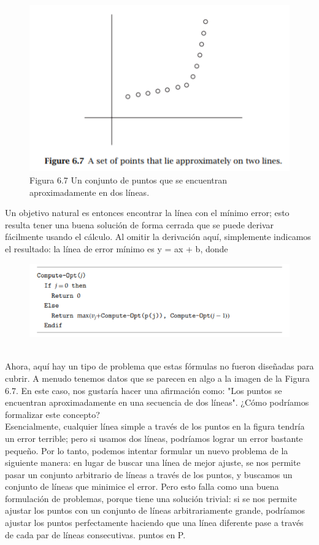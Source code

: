 \documentclass[a4paper]{article}
\begin{document}
\begin{figure}[h]
\centering
\includegraphics[scale=1]{Imagenes-Seccion6/fig6_7.PNG}
\caption{Figura 6.7 Un conjunto de puntos que se encuentran aproximadamente en dos líneas.}
\end{figure}

Un objetivo natural es entonces encontrar la línea con el mínimo error; esto resulta tener una buena solución de forma cerrada que se puede derivar fácilmente usando el cálculo. Al omitir la derivación aquí, simplemente indicamos el resultado: la línea de error mínimo es y = ax + b, donde


\begin{figure}[h]
\centering
\includegraphics[scale=1]{Imagenes-Seccion6/cod6_1.PNG}
\end{figure}\\

Ahora, aquí hay un tipo de problema que estas fórmulas no fueron diseñadas para cubrir. A menudo tenemos datos que se parecen en algo a la imagen de la Figura 6.7. En este caso, nos gustaría hacer una afirmación como: "Los puntos se encuentran aproximadamente en una secuencia de dos líneas". ¿Cómo podríamos formalizar este concepto?\\

Esencialmente, cualquier línea simple a través de los puntos en la figura tendría un error terrible; pero si usamos dos líneas, podríamos lograr un error bastante pequeño. Por lo tanto, podemos intentar formular un nuevo problema de la siguiente manera: en lugar de buscar una línea de mejor ajuste, se nos permite pasar un conjunto arbitrario de líneas a través de los puntos, y buscamos un conjunto de líneas que minimice el error. Pero esto falla como una buena formulación de problemas, porque tiene una solución trivial: si se nos permite ajustar los puntos con un conjunto de líneas arbitrariamente grande, podríamos ajustar los puntos perfectamente haciendo que una línea diferente pase a través de cada par de líneas consecutivas. puntos en P.\\
\end{document}
